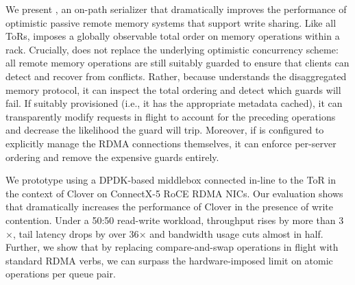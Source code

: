 We present {\sword}, an on-path serializer
that dramatically improves the performance of optimistic passive
remote memory systems that support write sharing.  Like all ToRs,
{\sword} imposes a globally observable total order on memory
operations within a rack.  Crucially, {\sword} does not replace the
underlying optimistic concurrency scheme: all remote memory operations
are still suitably guarded to ensure that clients can detect and
recover from conflicts.  Rather, because {\sword} understands the
disaggregated memory protocol, it can inspect the total ordering and
detect which guards will fail.  If suitably provisioned (i.e., it has
the appropriate metadata cached), it can transparently modify requests
in flight to account for the preceding operations and decrease the
likelihood the guard will trip.  Moreover, if {\sword} is configured
to explicitly manage the RDMA connections themselves, it can enforce
per-server ordering and remove the expensive guards entirely.

We prototype {\sword} using a DPDK-based middlebox connected in-line
to the ToR in the context of Clover on ConnectX-5 RoCE RDMA NICs.  Our
evaluation shows that {\sword} dramatically increases the performance
of Clover in the presence of write contention.  Under a 50:50
read-write workload, throughput rises by more than 3$\times$, tail
latency drops by over 36$\times$ and bandwidth usage cuts almost in
half.  Further, we show that by replacing compare-and-swap operations
in flight with standard RDMA verbs, we can surpass the
hardware-imposed limit on atomic operations per queue pair.

